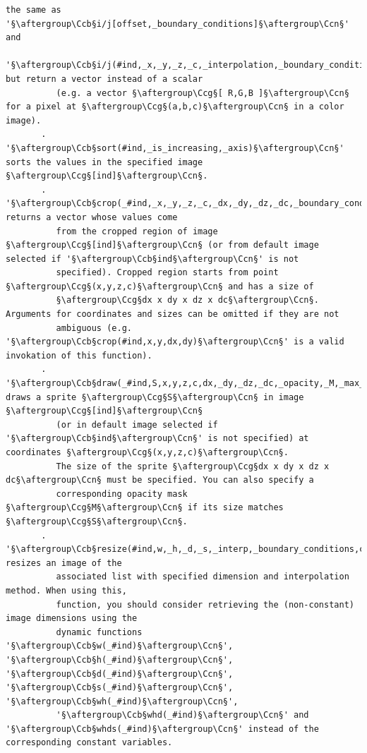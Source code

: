 \documentclass[a4paper,10.5pt,twoside]{book}
\def\Ccb{\color{cb}}
\def\Ccg{\color{cc}}
\def\Ccn{\color{black}}
\begin{document}
\begin{lstlisting}[escapechar=§]
          the same as '§\aftergroup\Ccb§i/j[offset,_boundary_conditions]§\aftergroup\Ccn§' and 
          '§\aftergroup\Ccb§i/j(#ind,_x,_y,_z,_c,_interpolation,_boundary_conditions)§\aftergroup\Ccn§' but return a vector instead of a scalar 
          (e.g. a vector §\aftergroup\Ccg§[ R,G,B ]§\aftergroup\Ccn§ for a pixel at §\aftergroup\Ccg§(a,b,c)§\aftergroup\Ccn§ in a color image). 
       . '§\aftergroup\Ccb§sort(#ind,_is_increasing,_axis)§\aftergroup\Ccn§' sorts the values in the specified image §\aftergroup\Ccg§[ind]§\aftergroup\Ccn§. 
       . '§\aftergroup\Ccb§crop(_#ind,_x,_y,_z,_c,_dx,_dy,_dz,_dc,_boundary_conditions)§\aftergroup\Ccn§' returns a vector whose values come 
          from the cropped region of image §\aftergroup\Ccg§[ind]§\aftergroup\Ccn§ (or from default image selected if '§\aftergroup\Ccb§ind§\aftergroup\Ccn§' is not 
          specified). Cropped region starts from point §\aftergroup\Ccg§(x,y,z,c)§\aftergroup\Ccn§ and has a size of 
          §\aftergroup\Ccg§dx x dy x dz x dc§\aftergroup\Ccn§. Arguments for coordinates and sizes can be omitted if they are not 
          ambiguous (e.g. '§\aftergroup\Ccb§crop(#ind,x,y,dx,dy)§\aftergroup\Ccn§' is a valid invokation of this function). 
       . '§\aftergroup\Ccb§draw(_#ind,S,x,y,z,c,dx,_dy,_dz,_dc,_opacity,_M,_max_M)§\aftergroup\Ccn§' draws a sprite §\aftergroup\Ccg§S§\aftergroup\Ccn§ in image §\aftergroup\Ccg§[ind]§\aftergroup\Ccn§ 
          (or in default image selected if '§\aftergroup\Ccb§ind§\aftergroup\Ccn§' is not specified) at coordinates §\aftergroup\Ccg§(x,y,z,c)§\aftergroup\Ccn§. 
          The size of the sprite §\aftergroup\Ccg§dx x dy x dz x dc§\aftergroup\Ccn§ must be specified. You can also specify a 
          corresponding opacity mask §\aftergroup\Ccg§M§\aftergroup\Ccn§ if its size matches §\aftergroup\Ccg§S§\aftergroup\Ccn§. 
       . '§\aftergroup\Ccb§resize(#ind,w,_h,_d,_s,_interp,_boundary_conditions,cx,_cy,_cz,_cc)§\aftergroup\Ccn§' resizes an image of the 
          associated list with specified dimension and interpolation method. When using this, 
          function, you should consider retrieving the (non-constant) image dimensions using the 
          dynamic functions '§\aftergroup\Ccb§w(_#ind)§\aftergroup\Ccn§', '§\aftergroup\Ccb§h(_#ind)§\aftergroup\Ccn§', '§\aftergroup\Ccb§d(_#ind)§\aftergroup\Ccn§', '§\aftergroup\Ccb§s(_#ind)§\aftergroup\Ccn§', '§\aftergroup\Ccb§wh(_#ind)§\aftergroup\Ccn§', 
          '§\aftergroup\Ccb§whd(_#ind)§\aftergroup\Ccn§' and '§\aftergroup\Ccb§whds(_#ind)§\aftergroup\Ccn§' instead of the corresponding constant variables. 

\end{lstlisting}
\end{document}
